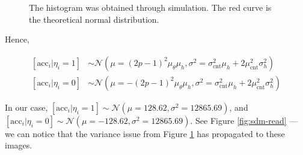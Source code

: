 \begin{figure}[h!]
  \centering


  \caption{The histogram was obtained through simulation. The red curve is the theoretical normal distribution.}
  \label{fig:sdm-read-sums}
\end{figure}

Hence,

\begin{align}
\left[ \text{acc}_i|\eta_i=1 \right] &\sim \mathcal{N}(\mu = (2p-1)^2 \mu_\theta \mu_h, \sigma^2 = \sigma_\text{cnt}^2 \mu_h + 2 \mu_\text{cnt}^2 \sigma^2_h) \label{eqn:sdm-eta1} \\
\left[ \text{acc}_i|\eta_i=0 \right] &\sim \mathcal{N}(\mu = -(2p-1)^2 \mu_\theta \mu_h, \sigma^2 = \sigma_\text{cnt}^2 \mu_h + 2 \mu_\text{cnt}^2 \sigma^2_h) \label{eqn:sdm-eta0}
\end{align}

In our case, $\left[ \text{acc}_i|\eta_i=1 \right] \sim \mathcal{N}(\mu = 128.62, \sigma^2 = 12865.69)$, and $\left[ \text{acc}_i|\eta_i=0 \right] \sim \mathcal{N}(\mu = -128.62, \sigma^2 = 12865.69)$. See Figure \ref{fig:sdm-read} --- we can notice that the variance issue from Figure \ref{fig:sdm-read-sums} has propagated to these images.

